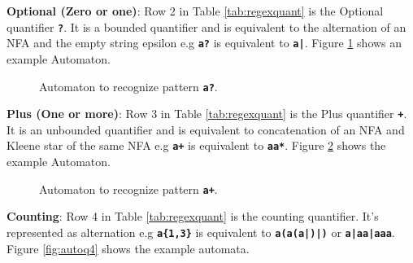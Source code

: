 \noindent
\textbf{Optional (Zero or one)}: Row 2 in Table \ref{tab:regexquant} is the Optional quantifier \texttt{\textbf{?}}. It is a bounded quantifier and is  equivalent to the alternation of an NFA and the empty string epsilon e.g \texttt{\textbf{a?}} is equivalent to \texttt{\textbf{a|\epsilon}}. Figure \ref{fig:autoq3} shows an example Automaton.


\begin{figure}[htpb]
\centering
{}
\caption{Automaton to recognize pattern \texttt{\textbf{a?}}.}
\label{fig:autoq3}
\end{figure}

\noindent
\textbf{Plus (One or more)}: Row 3 in Table \ref{tab:regexquant} is the Plus quantifier \texttt{\textbf{+}}. It is an unbounded quantifier and is equivalent to concatenation of an NFA and Kleene star of the same NFA e.g \texttt{\textbf{a+}} is equivalent to \texttt{\textbf{aa*}}. Figure \ref{fig:autoq2} shows the example Automaton.

\begin{figure}[htpb]
\centering
{}
\caption{Automaton to recognize pattern \texttt{\textbf{a+}}.}
\label{fig:autoq2}
\end{figure}

\newpage
\textbf{Counting}: Row 4 in Table \ref{tab:regexquant} is the counting quantifier. It's represented as alternation e.g \texttt{\textbf{a\{1,3\}}} is equivalent to \texttt{\textbf{a(a(a|\epsilon)|\epsilon)}} or \texttt{\textbf{a|aa|aaa}}. Figure \ref{fig:autoq4} shows the example automata.

